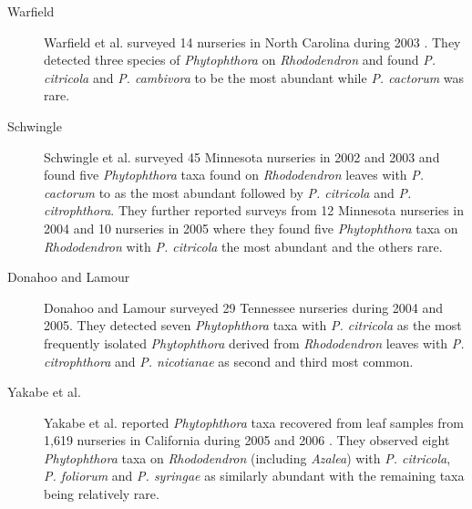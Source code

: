 \documentclass[12pt]{article}
\begin{document}
\begin{description}
  \item[Warfield] Warfield et al. surveyed 14 nurseries in North Carolina during 2003 \cite{warfield_etal_2008}.  They detected three species of \emph{Phytophthora} on \emph{Rhododendron} and found \emph{P. citricola} and \emph{P. cambivora} to be the most abundant while \emph{P. cactorum} was rare.

  \item[Schwingle] Schwingle et al.\cite{schwingle_etal_2007} surveyed 45 Minnesota nurseries in 2002 and 2003 and found five \emph{Phytophthora} taxa found on \emph{Rhododendron} leaves with \emph{P. cactorum} to as the most abundant followed by \emph{P. citricola} and \emph{P. citrophthora}.  They further reported surveys from 12 Minnesota nurseries in 2004 and 10 nurseries in 2005 where they found five \emph{Phytophthora} taxa on \emph{Rhododendron} with \emph{P. citricola} the most abundant and the others rare.

  \item[Donahoo and Lamour] Donahoo and Lamour surveyed 29 Tennessee nurseries during 2004 and 2005\cite{donahoo_lamour_2008}.  They detected seven \emph{Phytophthora} taxa with \emph{P. citricola} as the most frequently isolated \emph{Phytophthora} derived from \emph{Rhododendron} leaves with \emph{P. citrophthora} and \emph{P. nicotianae} as second and third most common.

  \item[Yakabe et al.] Yakabe et al. reported \emph{Phytophthora} taxa recovered from leaf samples from 1,619 nurseries in California during 2005 and 2006 \cite{yakabe_etal_2009}.  They observed eight \emph{Phytophthora} taxa on \emph{Rhododendron} (including \emph{Azalea}) with \emph{P. citricola}, \emph{P. foliorum} and \emph{P. syringae} as similarly abundant with the remaining taxa being relatively rare.


% 


\end{description}
\end{document}
